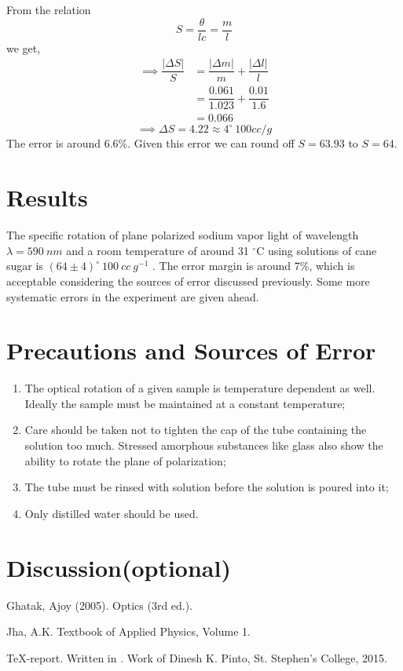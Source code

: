 \documentclass{dkpinto-report}
\begin{document}
From the relation 
$$S = \dfrac{\theta}{lc} = \dfrac{m}{l}$$
we get, 
\begin{align*}
\implies \dfrac{|\Delta S|}{S}  &= \dfrac{|\Delta m|}{m} + \dfrac{|\Delta l| }{l} \\
&= \dfrac{0.061}{1.023} + \dfrac{0.01}{1.6}\\
&= 0.066
\end{align*}
$$\implies \Delta S =  4.22 \approx 4^{\circ}\ 100 cc / g$$
The error is around 6.6\%. Given this error we can round off $S = 63.93$ to $S = 64$.

\section{Results}
The specific rotation of plane polarized sodium vapor light of wavelength $\lambda = 590\ nm$ and a room temperature of  around 31 $^{\circ}$C using solutions of cane sugar is $(64  \pm 4 ) ^{\circ}\ 100\ cc\ g^{-1}$ . The error margin is around 7\%, which is acceptable considering the sources of error discussed previously. Some more systematic errors in the experiment are given ahead.

 
\section{Precautions and Sources of Error}
\begin{enumerate}
\itemsep0em
\item The optical rotation of a given sample is temperature dependent as well. Ideally the sample must be maintained at a constant temperature;
\item Care should be taken not to tighten the cap of the tube containing the solution too much.  Stressed amorphous substances like glass also show the ability to rotate the plane of polarization;
\item The tube must be rinsed with solution before the solution is poured into it;
\item Only distilled water should be used.
\end{enumerate}

\section{Discussion(optional)}


\begin{thebibliography}{99}
Ghatak, Ajoy (2005). Optics (3rd ed.). 

Jha, A.K. Textbook of Applied Physics, Volume 1.

\TeX-report. Written in \LaTeXe. Work of Dinesh K. Pinto, St. Stephen's College, 2015.
\end{thebibliography}
\end{document}
